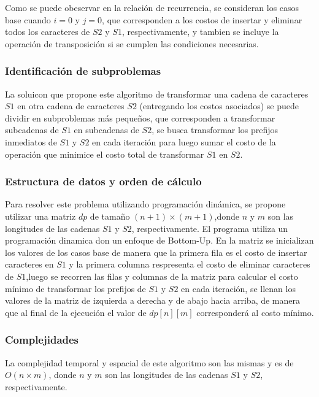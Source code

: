 Como se puede obeservar en la relación de recurrencia, se consideran los casos base cuando $i = 0$ y $j = 0$,
que corresponden a los costos de insertar y eliminar todos los caracteres de $S2$ y $S1$, respectivamente, y tambien
se incluye la operación de transposición si se cumplen las condiciones necesarias.

\subsubsection{Identificación de subproblemas}

La soluicon que propone este algoritmo de transformar una cadena de caracteres $S1$ en otra cadena de caracteres $S2$ 
(entregando los costos asociados) se puede dividir en subproblemas más pequeños, que corresponden a transformar
subcadenas de $S1$ en subcadenas de $S2$, se busca transformar los prefijos inmediatos de $S1$ y $S2$ en cada iteración
para luego sumar el costo de la operación que minimice el costo total de transformar $S1$ en $S2$.

\subsubsection{Estructura de datos y orden de cálculo}

Para resolver este problema utilizando programación dinámica, se propone utilizar una matriz $dp$ de tamaño $(n+1) 
\times (m+1)$,donde $n$ y $m$ son las longitudes de las cadenas $S1$ y $S2$, respectivamente. El programa utiliza un
programación dinamica don un enfoque de Bottom-Up. En la matriz se inicializan los valores de los casos base de
manera que la primera fila es el costo de insertar caracteres en $S1$ y la primera columna respresenta el costo de
eliminar caracteres de $S1$,luego se recorren las filas y columnas de la matriz para calcular el costo mínimo 
de transformar los prefijos de $S1$ y $S2$ en cada iteración, se llenan los valores de la matriz de izquierda a derecha
y de abajo hacia arriba, de manera que al final de la ejecución el valor de $dp[n][m]$ corresponderá al costo mínimo.

\subsubsection{Complejidades}

La complejidad temporal y espacial de este algoritmo son las mismas y es de $O(n \times m)$, donde $n$ y $m$ son 
las longitudes de las cadenas $S1$ y $S2$, respectivamente.

